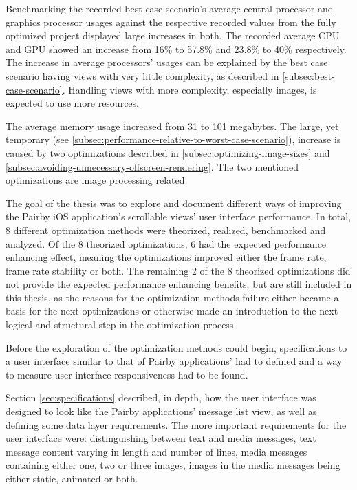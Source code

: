 \documentclass[a4paper,12pt]{article}
\begin{document}
Benchmarking the recorded best case scenario's average central processor and graphics processor usages against the respective recorded values from the fully optimized project displayed large increases in both. The recorded average CPU and GPU showed an increase from 16\% to 57.8\% and 23.8\% to 40\% respectively. The increase in average processors' usages can be explained by the best case scenario having views with very little complexity, as described in \autoref{subsec:best-case-scenario}. Handling views with more complexity, especially images, is expected to use more resources.

The average memory usage increased from 31 to 101 megabytes. The large, yet temporary (see \autoref{subsec:performance-relative-to-worst-case-scenario}), increase is caused by two optimizations described in \autoref{subsec:optimizing-image-sizes} and \autoref{subsec:avoiding-unnecessary-offscreen-rendering}. The two mentioned optimizations are image processing related.

The goal of the thesis was to explore and document different ways of improving the Pairby iOS application's scrollable views' user interface performance. In total, 8 different optimization methods were theorized, realized, benchmarked and analyzed. Of the 8 theorized optimizations, 6 had the expected performance enhancing effect, meaning the optimizations improved either the frame rate, frame rate stability or both. The remaining 2 of the 8 theorized optimizations did not provide the expected performance enhancing benefits, but are still included in this thesis, as the reasons for the optimization methods failure either became a basis for the next optimizations or otherwise made an introduction to the next logical and structural step in the optimization process.

Before the exploration of the optimization methods could begin, specifications to a user interface similar to that of Pairby applications' had to defined and a way to measure user interface responsiveness had to be found.

Section \ref{sec:specifications} described, in depth, how the user interface was designed to look like the Pairby applications' message list view, as well as defining some data layer requirements. The more important requirements for the user interface were: distinguishing between text and media messages, text message content varying in length and number of lines, media messages containing either one, two or three images, images in the media messages being either static, animated or both.
\end{document}
